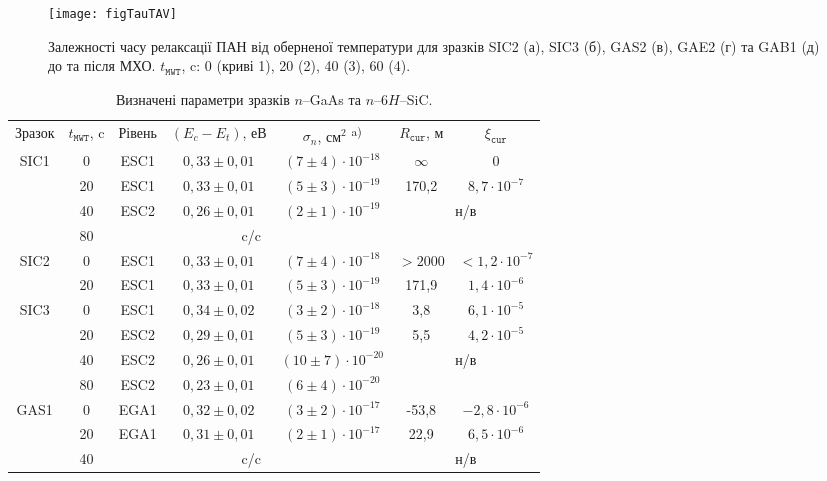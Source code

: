 \begin{figure}
\center
\texttt{[image: figTauTAV]}
\caption{\label{figTauTAV}
Залежності часу релаксації ПАН від оберненої температури для
зразків SIC2 (а), SIC3 (б), GAS2 (в), GAE2 (г) та GAB1 (д) до та після МХО.
$t_\mathtt{MWT}$, c: 0 (криві 1), 20 (2), 40 (3), 60 (4).
}%
\end{figure}

\begin{table}
\caption{\label{tabMW}Визначені параметри зразків $n$--GaAs та $n$--6$H$--SiC.
}
\center
\begin{tabular}{|c|c|c|c|c|c|c|}
\hline
Зразок& $t_\mathtt{MWT}$, c &Рівень &$(E_c-E_t)$, еВ &$\sigma_n$, см$^2$\textsuperscript{ a)}&$R_\mathtt{cur}$, м&$\xi_\mathtt{cur}$\\
\hhline{|=======|}
SIC1& 0 &ESC1& $0,33\pm0,01$ &$(7\pm4)\cdot10^{-18}$&$\infty$&0\\ \cline{2-7}
& 20 &ESC1& $0,33\pm0,01$ &$(5\pm3)\cdot10^{-19}$&170,2&$8,7\cdot10^{-7}$\\ \cline{2-7}
& 40 &ESC2& $0,26\pm0,01$ &$(2\pm1)\cdot10^{-19}$&\multicolumn{2}{c|}{\multirow{2}{*}{н/в}}\\ \cline{2-5}
& 80 & \multicolumn{3}{c|}{c/c}&\multicolumn{2}{c|}{}\\ \hline
SIC2& 0 &ESC1& $0,33\pm0,01$ &$(7\pm4)\cdot10^{-18}$&$>2000$&$<1,2\cdot10^{-7}$\\ \cline{2-7}
& 20 &ESC1& $0,33\pm0,01$ &$(5\pm3)\cdot10^{-19}$&171,9&$1,4\cdot10^{-6}$\\ \hline
SIC3& 0 &ESC1& $0,34\pm0,02$ &$(3\pm2)\cdot10^{-18}$&3,8&$6,1\cdot10^{-5}$\\ \cline{2-7}
& 20 &ESC2&$0,29\pm0,01$ &$(5\pm3)\cdot10^{-19}$&5,5&$4,2\cdot10^{-5}$\\ \cline{2-7}
& 40 &ESC2& $0,26\pm0,01$ &$(10\pm7)\cdot10^{-20}$&\multicolumn{2}{c|}{\multirow{2}{*}{н/в}}\\ \cline{2-5}
& 80 &ESC2& $0,23\pm0,01$ &$(6\pm4)\cdot10^{-20}$&\multicolumn{2}{c|}{}\\ \hline
GAS1& 0 &EGA1& $0,32\pm0,02$ &$(3\pm2)\cdot10^{-17}$&-53,8&$-2,8\cdot10^{-6}$\\ \cline{2-7}
& 20 &EGA1& $0,31\pm0,01$ &$(2\pm1)\cdot10^{-17}$&22,9&$6,5\cdot10^{-6}$\\ \cline{2-7}
& 40 & \multicolumn{3}{c|}{c/c}&\multicolumn{2}{c|}{н/в}\\ \hline

\end{tabular}
\end{table}
